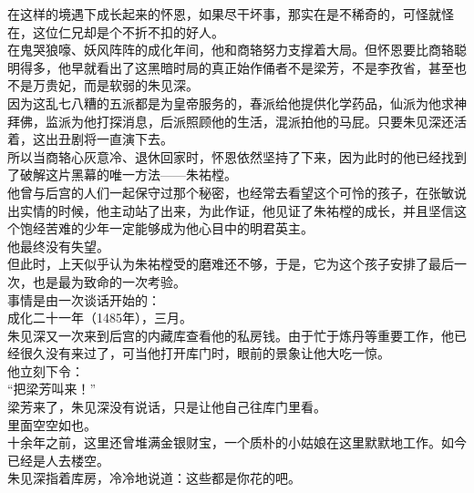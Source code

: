 \begin{multicols}{\theparacolNo}
在这样的境遇下成长起来的怀恩，如果尽干坏事，那实在是不稀奇的，可怪就怪在，这位仁兄却是个不折不扣的好人。\\

在鬼哭狼嚎、妖风阵阵的成化年间，他和商辂努力支撑着大局。但怀恩要比商辂聪明得多，他早就看出了这黑暗时局的真正始作俑者不是梁芳，不是李孜省，甚至也不是万贵妃，而是软弱的朱见深。\\

因为这乱七八糟的五派都是为皇帝服务的，春派给他提供化学药品，仙派为他求神拜佛，监派为他打探消息，后派照顾他的生活，混派拍他的马屁。只要朱见深还活着，这出丑剧将一直演下去。\\

所以当商辂心灰意冷、退休回家时，怀恩依然坚持了下来，因为此时的他已经找到了破解这片黑幕的唯一方法——朱祐樘。\\

他曾与后宫的人们一起保守过那个秘密，也经常去看望这个可怜的孩子，在张敏说出实情的时候，他主动站了出来，为此作证，他见证了朱祐樘的成长，并且坚信这个饱经苦难的少年一定能够成为他心目中的明君英主。\\

他最终没有失望。\\

但此时，上天似乎认为朱祐樘受的磨难还不够，于是，它为这个孩子安排了最后一次，也是最为致命的一次考验。\\

事情是由一次谈话开始的：\\

成化二十一年（1485年），三月。\\

朱见深又一次来到后宫的内藏库查看他的私房钱。由于忙于炼丹等重要工作，他已经很久没有来过了，可当他打开库门时，眼前的景象让他大吃一惊。\\

他立刻下令：\\

“把梁芳叫来！”\\

梁芳来了，朱见深没有说话，只是让他自己往库门里看。\\

里面空空如也。\\

十余年之前，这里还曾堆满金银财宝，一个质朴的小姑娘在这里默默地工作。如今已经是人去楼空。\\

朱见深指着库房，冷冷地说道：这些都是你花的吧。\\


\end{multicols}
